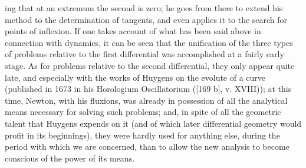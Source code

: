 ing that at an extremum the second is zero; he goes from there to extend his method to the determination of tangents, and even applies it to the search for points of inflexion. If one takes account of what has been said above in connection with dynamics, it can be seen that the unification of the three types of problems relative to the first differential was accomplished at a fairly early stage. As for problems relative to the second differential, they only appear quite late, and especially with the works of Huygens on the evolute of a curve (published in 1673 in his Horologium Oscillatorium ({[}169 b{]}, v. XVIII)); at this time, Newton, with his fluxions, was already in possession of all the analytical means necessary for solving such problems; and, in spite of all the geometric talent that Huygens expends on it (and of which later differential geometry would profit in its beginnings), they were hardly used for anything else, during the period with which we are concerned, than to allow the new analysis to become conscious of the power of its means.

